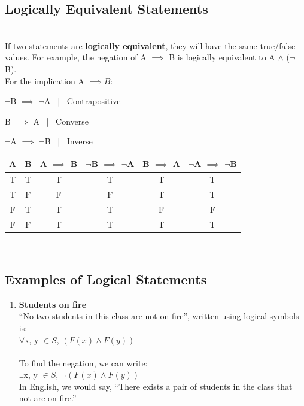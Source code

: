 \documentclass{article}
\begin{document}
\subsection{Logically Equivalent Statements}\\
If two statements are \textbf{logically equivalent}, they will have the same true/false values. For example, the negation of A $\implies$ B is logically equivalent to A $\land$ ($\neg$ B).
\\
For the implication A $\implies B$:

    $\neg$B $\implies$ $\neg$A \ | \ Contrapositive
    
    B $\implies$ A \ | \ Converse
    
    $\neg$A $\implies$ $\neg$B \ | \ Inverse

\begin{center}
    \begin{tabular}{ c|c|c|c|c|c }
    A & B & A $\implies$ B & $\neg$B $\implies$ $\neg$A & B $\implies$ A & $\neg$A $\implies$ $\neg$B\\
    \hline
    T & T & T & T & T & T\\
    T & F & F & F & T & T\\
    F & T & T & T & F & F\\
    F & F & T & T & T & T
    \end{tabular}
\end{center}
\\ \subsection{Examples of Logical Statements}
\begin{enumerate}
    \item \textbf{Students on fire}\\
    ``No two students in this class are not on fire'', written using logical symbols is:\\
$\forall$x, y $\in S$, $(F(x) \land F(y))$\\\\
To find the negation, we can write:\\
$\exists$x, y $\in S$, $\neg(F(x) \land F(y))$\\
In English, we would say, ``There exists a pair of students in the class that not are on fire.''
\end{enumerate}
\end{document}
